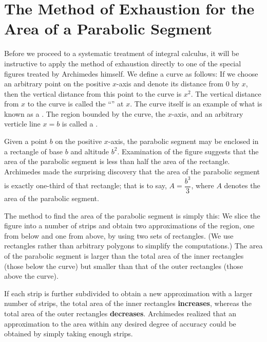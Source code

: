 \section{The Method of Exhaustion for the Area of a Parabolic Segment}\label{sec:1.1.3}

\begin{note}
  Before we proceed to a systematic treatment of integral calculus, it will be instructive to apply the method of exhaustion directly to one of the special figures treated by Archimedes himself.
  We define a curve as follows:
  If we choose an arbitrary point on the positive \(x\)-axis and denote its distance from \(0\) by \(x\), then the vertical distance from this point to the curve is \(x^2\).
  The vertical distance from \(x\) to the curve is called the ``'' at \(x\).
  The curve itself is an example of what is known as a \textbf{}.
  The region bounded by the curve, the \(x\)-axis, and an arbitrary verticle line \(x = b\) is called a \textbf{}.

  Given a point \(b\) on the positive \(x\)-axis, the parabolic segment may be enclosed in a rectangle of base \(b\) and altitude \(b^2\).
  Examination of the figure suggests that the area of the parabolic segment is less than half the area of the rectangle.
  Archimedes made the surprising discovery that the area of the parabolic segment is exactly one-third of that rectangle;
  that is to say, \(A = \dfrac{b^3}{3}\), where \(A\) denotes the area of the parabolic segment.

  The method to find the area of the parabolic segment is simply this:
  We slice the figure into a number of strips and obtain two approximations of the region, one from below and one from above, by using two sets of rectangles.
  (We use rectangles rather than arbitrary polygons to simplify the computations.)
  The area of the parabolic segment is larger than the total area of the inner rectangles (those below the curve) but smaller than that of the outer rectangles (those above the curve).

  If each strip is further subdivided to obtain a new approximation with a larger number of strips, the total area of the inner rectangles \textbf{increases}, whereas the total area of the outer rectangles \textbf{decreases}.
  Archimedes realized that an approximation to the area within any desired degree of accuracy could be obtained by simply taking enough strips.


\end{note}
